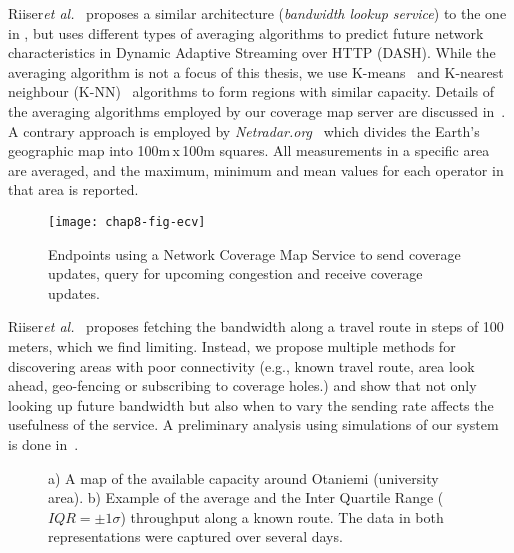 Riiser\emph{et al.}~\cite{6012045} proposes a similar architecture (\emph{bandwidth lookup
service}) to the one in , but uses different types of
averaging algorithms to predict future network characteristics in Dynamic
Adaptive Streaming over HTTP (DASH). While the averaging algorithm is not a
focus of this thesis, we use K-means~\cite{Kanungo:2002:LSA:513400.513402} and
K-nearest neighbour (K-NN)~\cite{Iwerks:2003:CKN:1315451.1315496} algorithms to
form regions with similar capacity. Details of the averaging algorithms
employed by our coverage map server are discussed in~\cite{sharmistha-thesis}.
A contrary approach is employed by \emph{Netradar.org}~\cite{6576402} which
divides the Earth's geographic map into 100m\,x\,100m squares. All measurements in a
specific area are averaged, and the maximum, minimum and mean values for 
each operator in that area is reported. 

\begin{figure}[!t]
\texttt{[image: chap8-fig-ecv]}
  \caption{Endpoints using a Network Coverage Map Service to send coverage
  updates, query for upcoming congestion and receive coverage updates.}
\label{fig:cc:ecv}
\end{figure}

Riiser\emph{et al.}~\cite{Riiser:2012:2240136} proposes fetching the bandwidth along a travel
route in steps of 100 meters, which we find limiting. Instead, we propose
multiple methods for discovering areas with poor connectivity (e.g., known
travel route, area look ahead, geo-fencing or subscribing to coverage holes.)
and show that not only looking up future bandwidth but also when to vary the
sending rate affects the usefulness of the service. A preliminary analysis
using simulations of our system is done in~\cite{Curcio:glass}.

\begin{figure}[!t]
  \centerline{
  }
  \centerline{
  }
  \caption{a) A map of the available capacity around Otaniemi (university
  area). b) Example of the average and the Inter Quartile Range
  ($IQR=\pm1\sigma$) throughput along a known route. The data in both
  representations were captured over several days.}
  \label{fig:glass:map}
\end{figure}

